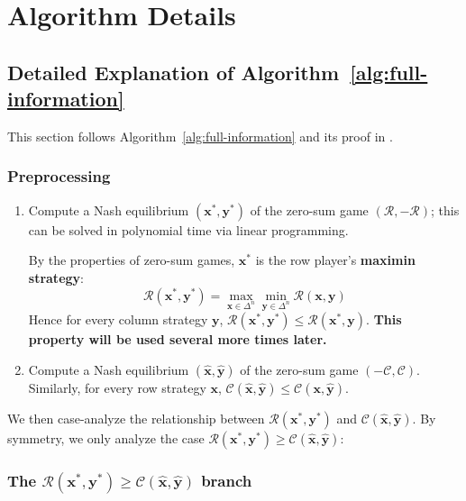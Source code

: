 \section{Algorithm Details}
\label{app:algo-details}

\subsection{Detailed Explanation of Algorithm~\ref{alg:full-information}}
\label{app:algo-1-details}

This section follows Algorithm~\ref{alg:full-information} and its proof in \cite[Section~3]{12WSNE}.

\subsubsection{Preprocessing}

\begin{enumerate}
  \item Compute a Nash equilibrium \((\mathbf{x}^*, \mathbf{y}^*)\) of the zero-sum game \((\mathcal{R}, -\mathcal{R})\); this can be solved in polynomial time via linear programming.

        By the properties of zero-sum games, \(\mathbf{x}^*\) is the row player's \textbf{maximin strategy}:
        \[
          \mathcal{R}(\mathbf{x}^*, \mathbf{y}^*) = \max_{\mathbf{x} \in \Delta^n} \min_{\mathbf{y} \in \Delta^n} \mathcal{R}(\mathbf{x}, \mathbf{y})
        \]
        Hence for every column strategy \(\mathbf{y}\), \(\mathcal{R}(\mathbf{x}^*, \mathbf{y}^*) \le \mathcal{R}(\mathbf{x}^*, \mathbf{y})\). \textbf{This property will be used several more times later.}

  \item Compute a Nash equilibrium \((\hat{\mathbf{x}}, \hat{\mathbf{y}})\) of the zero-sum game \((-\mathcal{C}, \mathcal{C})\). Similarly, for every row strategy \(\mathbf{x}\), \(\mathcal{C}(\hat{\mathbf{x}}, \hat{\mathbf{y}}) \le \mathcal{C}(\mathbf{x}, \hat{\mathbf{y}})\).
\end{enumerate}

We then case-analyze the relationship between \(\mathcal{R}(\mathbf{x}^*, \mathbf{y}^*)\) and \(\mathcal{C}(\hat{\mathbf{x}}, \hat{\mathbf{y}})\). By symmetry, we only analyze the case \textbf{\(\mathcal{R}(\mathbf{x}^*, \mathbf{y}^*) \ge \mathcal{C}(\hat{\mathbf{x}}, \hat{\mathbf{y}})\)}:

\subsubsection{The \texorpdfstring{\(\mathcal{R}(\mathbf{x}^*, \mathbf{y}^*) \ge \mathcal{C}(\hat{\mathbf{x}}, \hat{\mathbf{y}})\)}{R(x*,y*) >= C(xh,yh)} branch}

